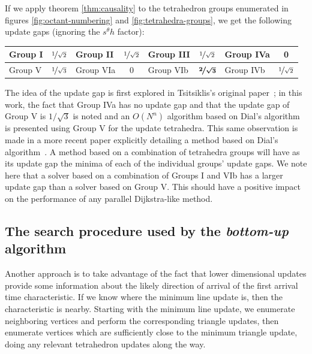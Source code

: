 \documentclass[smallcondensed]{svjour3}
\begin{document}
If we apply theorem \ref{thm:causality} to the tetrahedron groups
enumerated in figures \ref{fig:octant-numbering} and
\ref{fig:tetrahedra-groups}, we get the following update gaps
(ignoring the $s^\theta h$ factor): \vspace{0.5em}
\begin{center}
  \begin{tabular}{lc|lc|lc|lc}
    Group I & $\nicefrac{1}{\sqrt{2}}$ & Group II & $\nicefrac{1}{\sqrt{2}}$ & Group III & $\nicefrac{1}{\sqrt{2}}$ & Group IVa & 0 \\
    \midrule
    Group V & $\nicefrac{1}{\sqrt{3}}$ & Group VIa & 0 & Group VIb & $\boldsymbol{\nicefrac{2}{\sqrt{3}}}$ & Group IVb & $\nicefrac{1}{\sqrt{2}}$
  \end{tabular}
\end{center}
\vspace{0.5em} The idea of the update gap is first explored in
Tsitsiklis's original paper~\cite{tsitsiklis1995efficient}; in this
work, the fact that Group IVa has no update gap and that the update
gap of Group V is $1/\sqrt{3}$ is noted and an $O(N^n)$ algorithm
based on Dial's algorithm is presented using Group V for the update
tetrahedra. This same observation is made in a more recent paper
explicitly detailing a method based on Dial's
algorithm~\cite{kim2001calo}. A method based on a combination of
tetrahedra groups will have as its update gap the minima of each of
the individual groups' update gaps. We note here that a solver based
on a combination of Groups I and VIb has a larger update gap than a
solver based on Group V. This should have a positive impact on the
performance of any parallel Dijkstra-like method.

\subsection{The search procedure used by the \emph{bottom-up}
  algorithm}\label{ssec:bottom-up-search}

Another approach is to take advantage of the fact that lower
dimensional updates provide some information about the likely
direction of arrival of the first arrival time characteristic. If we
know where the minimum line update is, then the characteristic is
nearby. Starting with the minimum line update, we enumerate
neighboring vertices and perform the corresponding triangle updates,
then enumerate vertices which are sufficiently close to the minimum
triangle update, doing any relevant tetrahedron updates along the way.
\end{document}
